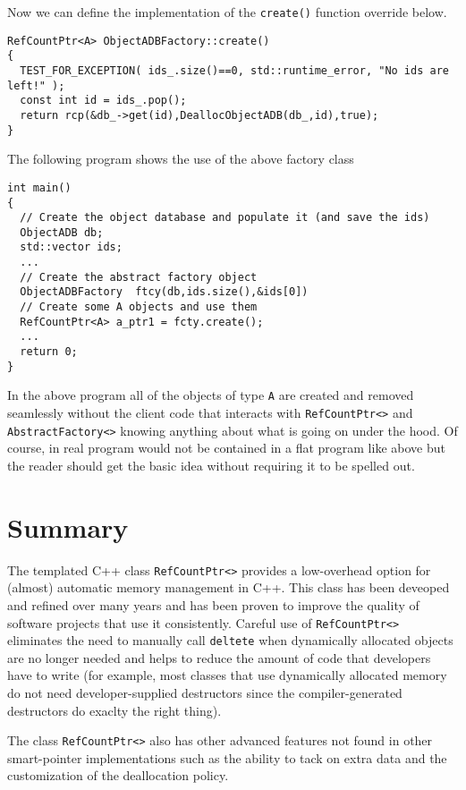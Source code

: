 Now we can define the implementation of the {}\texttt{create()} function
override below.
%
{\scriptsize\begin{verbatim}
RefCountPtr<A> ObjectADBFactory::create()
{
  TEST_FOR_EXCEPTION( ids_.size()==0, std::runtime_error, "No ids are left!" );
  const int id = ids_.pop();
  return rcp(&db_->get(id),DeallocObjectADB(db_,id),true);
}
\end{verbatim}}
%
The following program shows the use of the above factory class
%
{\scriptsize\begin{verbatim}
int main()
{
  // Create the object database and populate it (and save the ids)
  ObjectADB db;
  std::vector ids;
  ...
  // Create the abstract factory object
  ObjectADBFactory  ftcy(db,ids.size(),&ids[0])
  // Create some A objects and use them
  RefCountPtr<A> a_ptr1 = fcty.create();
  ...
  return 0;
}
\end{verbatim}}
%
In the above program all of the objects of type {}\texttt{A} are
created and removed seamlessly without the client code that interacts
with {}\texttt{RefCountPtr<>} and {}\texttt{AbstractFactory<>} knowing
anything about what is going on under the hood.  Of course, in real
program would not be contained in a flat program like above but the
reader should get the basic idea without requiring it to be spelled
out.

%
\section{Summary}
%

The templated C++ class {}\texttt{RefCountPtr<>} provides a
low-overhead option for (almost) automatic memory management in C++.
This class has been deveoped and refined over many years and has been
proven to improve the quality of software projects that use it
consistently.  Careful use of {}\texttt{RefCountPtr<>} eliminates the
need to manually call {}\texttt{deltete} when dynamically allocated
objects are no longer needed and helps to reduce the amount of code
that developers have to write (for example, most classes that use
dynamically allocated memory do not need developer-supplied
destructors since the compiler-generated destructors do exaclty the
right thing).

The class {}\texttt{RefCountPtr<>} also has other advanced features
not found in other smart-pointer implementations such as the ability
to tack on extra data and the customization of the deallocation
policy.
